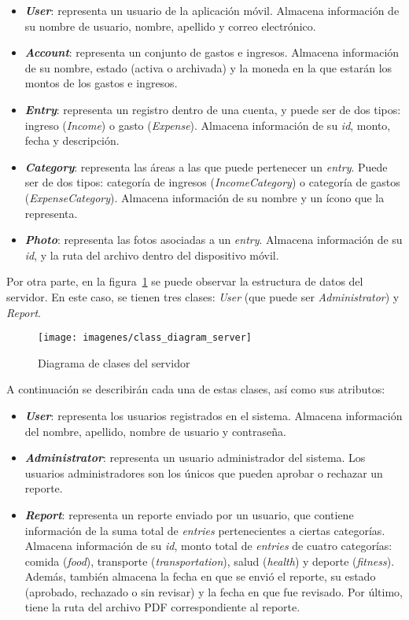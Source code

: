 \begin{itemize}
  \item \textbf{\textit{User}}: representa un usuario de la aplicación móvil. Almacena información de su nombre de usuario, nombre, apellido y correo electrónico.
	\item \textbf{\textit{Account}}: representa un conjunto de gastos e ingresos. Almacena información de su nombre, estado (activa o archivada) y la moneda en la que estarán los montos de los gastos e ingresos.
	\item \textbf{\textit{Entry}}: representa un registro dentro de una cuenta, y puede ser de dos tipos: ingreso (\textit{Income}) o gasto (\textit{Expense}). Almacena información de su \textit{id}, monto, fecha y descripción.
	\item \textbf{\textit{Category}}: representa las áreas a las que puede pertenecer un \textit{entry}. Puede ser de dos tipos: categoría de ingresos (\textit{IncomeCategory}) o categoría de gastos (\textit{ExpenseCategory}). Almacena información de su nombre y un ícono que la representa.
	\item \textbf{\textit{Photo}}: representa las fotos asociadas a un \textit{entry}. Almacena información de su \textit{id}, y la ruta del archivo dentro del dispositivo móvil.
\end{itemize}

Por otra parte, en la figura~\ref{fig:diagramaClasesServidor} se puede observar la estructura de datos del servidor. En este caso, se tienen tres clases: \textit{User} (que puede ser \textit{Administrator}) y \textit{Report}.

\begin{figure}[ht]
  \centering
  \texttt{[image: imagenes/class\_diagram\_server]}
  \caption{Diagrama de clases del servidor}
  \label{fig:diagramaClasesServidor}
\end{figure}

A continuación se describirán cada una de estas clases, así como sus atributos:

\begin{itemize}
	\item \textbf{\textit{User}}: representa los usuarios registrados en el sistema. Almacena información del nombre, apellido, nombre de usuario y contraseña. 
	\item \textbf{\textit{Administrator}}: representa un usuario administrador del sistema. Los usuarios administradores son los únicos que pueden aprobar o rechazar un reporte.
	\item \textbf{\textit{Report}}: representa un reporte enviado por un usuario, que contiene información de la suma total de \textit{entries} pertenecientes a ciertas categorías. Almacena información de su \textit{id}, monto total de \textit{entries} de cuatro categorías: comida (\textit{food}), transporte (\textit{transportation}), salud (\textit{health}) y deporte (\textit{fitness}). Además, también almacena la fecha en que se envió el reporte, su estado (aprobado, rechazado o sin revisar) y la fecha en que fue revisado. Por último, tiene la ruta del archivo PDF correspondiente al reporte.
\end{itemize} 

